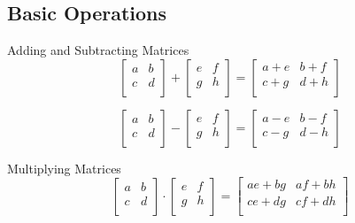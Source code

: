 \documentclass[12pt]{article}
\numberwithin{equation}{subsection}
\begin{document}
\subsection{Basic Operations}
\begin{flushleft}
Adding and Subtracting Matrices
\begin{equation}
\begin{bmatrix}
a & b \\
c & d \\
\end{bmatrix} 
+
\begin{bmatrix}
e & f \\
g & h \\
\end{bmatrix}
=
\begin{bmatrix}
a+e & b+f \\
c+g & d+h \\
\end{bmatrix}
\end{equation}

\begin{equation}
\begin{bmatrix}
a & b \\
c & d \\
\end{bmatrix} 
-
\begin{bmatrix}
e & f \\
g & h \\
\end{bmatrix}
=
\begin{bmatrix}
a-e & b-f \\
c-g & d-h \\
\end{bmatrix}
\end{equation}

Multiplying Matrices
\begin{equation}
\begin{bmatrix}
a & b \\
c & d \\
\end{bmatrix} 
\cdot
\begin{bmatrix}
e & f \\
g & h \\
\end{bmatrix}
=
\begin{bmatrix}
ae+bg & af+bh \\
ce+dg & cf+dh \\
\end{bmatrix}
\end{equation}


\end{flushleft}
\end{document}
